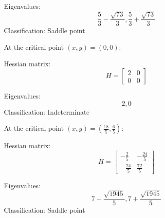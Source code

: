 \documentclass{article} %
\begin{document}
{    Eigenvalues:
    \[
    \frac{5}{3} - \frac{\sqrt{73}}{3}, \frac{5}{3} + \frac{\sqrt{73}}{3}
    \]
    Classification: 	Saddle point\
    \bigskip

    At the critical point $(x, y) = (0, 0)$:

    Hessian matrix:
    \[
    H = \left[\begin{matrix}2 & 0\\0 & 0\end{matrix}\right]
    \]

    Eigenvalues:
    \[
    2, 0
    \]
    Classification: 	Indeterminate\
    \bigskip

    At the critical point $(x, y) = (\frac{18}{5}, \frac{6}{5})$:

    Hessian matrix:
    \[
    H = \left[\begin{matrix}- \frac{2}{5} & - \frac{24}{5}\\- \frac{24}{5} & \frac{72}{5}\end{matrix}\right]
    \]

    Eigenvalues:
    \[
    7 - \frac{\sqrt{1945}}{5}, 7 + \frac{\sqrt{1945}}{5}
    \]
    Classification: 	Saddle point\
    \bigskip

}   
\end{document}
